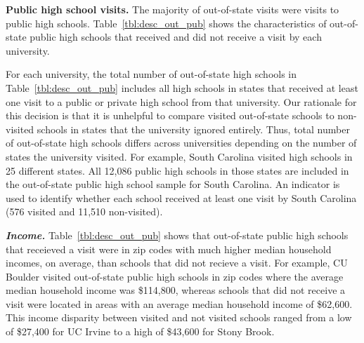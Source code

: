 \documentclass[twoside]{article}
\begin{document}
\textbf{Public high school visits.} The majority of out-of-state visits were visits to public high schools. Table~\ref{tbl:desc_out_pub} shows the characteristics of out-of-state public high schools that received and did not receive a visit by each university.






For each university, the total number of out-of-state high schools in Table~\ref{tbl:desc_out_pub} includes all high schools in states that received at least one visit to a public or private high school from that university.  Our rationale for this decision is that it is unhelpful to compare visited out-of-state schools to non-visited schools in states that the university ignored entirely. Thus, total number of out-of-state high schools differs across universities depending on the number of states the university visited.  For example, South Carolina visited high schools in 25 different states. All 12,086 public high schools in those states are included in the out-of-state public high school sample for South Carolina. An indicator is used to identify whether each school received at least one visit by South Carolina (576 visited and 11,510 non-visited).

\textbf{\textit{Income.}} Table~\ref{tbl:desc_out_pub} shows that out-of-state public high schools that receieved a visit were in zip codes with much higher median household incomes, on average, than schools that did not recieve a visit. For example, CU Boulder visited out-of-state public high schools in zip codes where the average median household income was \$114,800, whereas schools that did not receive a visit were located in areas with an average median household income of \$62,600. This income disparity between visited and not visited schools ranged from a low of \$27,400 for UC Irvine to a high of \$43,600 for Stony Brook. %
\end{document}

